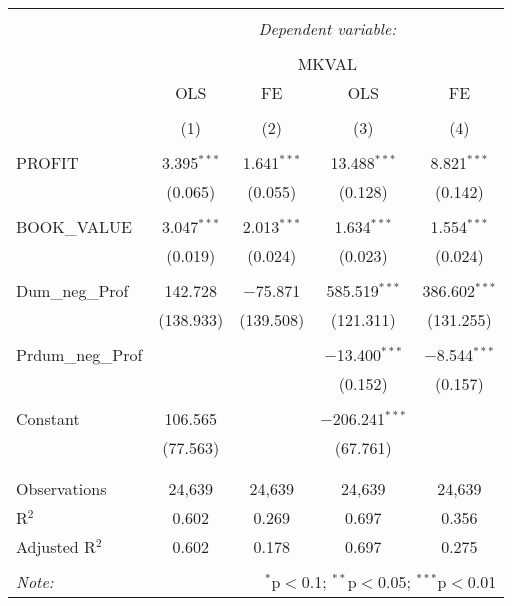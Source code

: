 \documentclass[11pt, letterpaper]{article}
\begin{document}
\begin{table}[!htbp] \centering 
  \caption{} 
  \label{4} 
\begin{tabular}{@{\extracolsep{5pt}}lcccc} 
\\[-1.8ex]\hline 
\hline \\[-1.8ex] 
 & \multicolumn{4}{c}{\textit{Dependent variable:}} \\ 
\cline{2-5} 
\\[-1.8ex] & \multicolumn{4}{c}{MKVAL} \\ 
 & OLS & FE & OLS & FE \\ 
\\[-1.8ex] & (1) & (2) & (3) & (4)\\ 
\hline \\[-1.8ex] 
 PROFIT & 3.395$^{***}$ & 1.641$^{***}$ & 13.488$^{***}$ & 8.821$^{***}$ \\ 
  & (0.065) & (0.055) & (0.128) & (0.142) \\ 
  & & & & \\ 
 BOOK\_VALUE & 3.047$^{***}$ & 2.013$^{***}$ & 1.634$^{***}$ & 1.554$^{***}$ \\ 
  & (0.019) & (0.024) & (0.023) & (0.024) \\ 
  & & & & \\ 
 Dum\_neg\_Prof & 142.728 & $-$75.871 & 585.519$^{***}$ & 386.602$^{***}$ \\ 
  & (138.933) & (139.508) & (121.311) & (131.255) \\ 
  & & & & \\ 
 Prdum\_neg\_Prof &  &  & $-$13.400$^{***}$ & $-$8.544$^{***}$ \\ 
  &  &  & (0.152) & (0.157) \\ 
  & & & & \\ 
 Constant & 106.565 &  & $-$206.241$^{***}$ &  \\ 
  & (77.563) &  & (67.761) &  \\ 
  & & & & \\ 
\hline \\[-1.8ex] 
Observations & 24,639 & 24,639 & 24,639 & 24,639 \\ 
R$^{2}$ & 0.602 & 0.269 & 0.697 & 0.356 \\ 
Adjusted R$^{2}$ & 0.602 & 0.178 & 0.697 & 0.275 \\ 
\hline 
\hline \\[-1.8ex] 
\textit{Note:}  & \multicolumn{4}{r}{$^{*}$p$<$0.1; $^{**}$p$<$0.05; $^{***}$p$<$0.01} \\ 
\end{tabular} 
\end{table}
\end{document}
